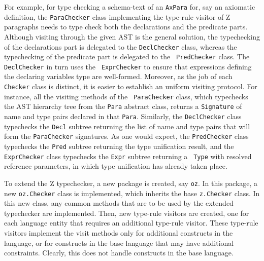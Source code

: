 \documentclass{llncs}
\begin{document}
For example, for type checking a schema-text of an {\tt AxPara} for,
say an axiomatic definition, the {\tt ParaChecker} class implementing
the type-rule visitor of Z paragraphs needs to type check both the
declarations and the predicate parts.  Although visiting through the
given AST is the general solution, the typechecking of the
declarations part is delegated to the {\tt DeclChecker} class, whereas
the typechecking of the predicate part is delegated to the {\tt
PredChecker} class.  The {\tt DeclChecker} in turn uses the {\tt
ExprChecker} to ensure that expressions defining the declaring
variables type are well-formed.  Moreover, as the job of each {\tt
Checker} class is distinct, it is easier to establish an uniform
visiting protocol. For instance, all the visiting methods of the {\tt
ParaChecker} class, which typechecks the AST hierarchy tree from the
{\tt Para} abstract class, returns a {\tt Signature} of name and type
pairs declared in that {\tt Para}. Similarly, the {\tt DeclChecker}
class typechecks the {\tt Decl} subtree returning the list of name and
type pairs that will form the {\tt ParaChecker} signatures.  As one
would expect, the {\tt PredChecker} class typechecks the {\tt Pred}
subtree returning the type unification result, and the {\tt
ExprChecker} class typechecks the {\tt Expr} subtree returning a {\tt
Type} with resolved reference parameters, in which type unification
has already taken place.

To extend the Z typechecker, a new package is created, say {\tt oz}.
In this package, a new {\tt oz.Checker} class is implemented, which
inherits the base {\tt z.Checker} class. In this new class, any common
methods that are to be used by the extended typechecker are implemented.
Then, new type-rule visitors are created, one for each language entity that
requires an additional type-rule visitor.  These type-rule visitors
implement the visit methods only for additional constructs in the
language, or for constructs in the base language that may have
additional constraints. Clearly, this does not handle constructs in
the base language.
\end{document}
